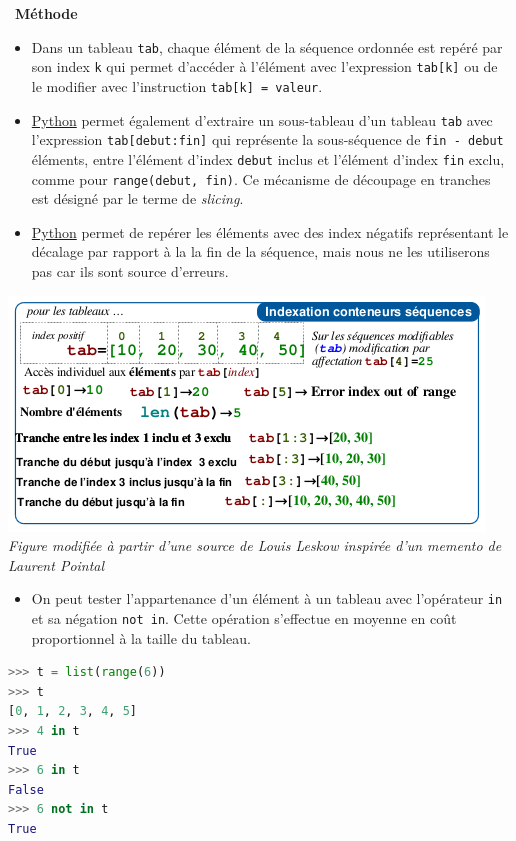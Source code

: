 \documentclass[
  11pt,
]{article}
\newcommand{\passthrough}[1]{#1}
\providecommand{\tightlist}{%
  \setlength{\itemsep}{0pt}\setlength{\parskip}{0pt}}
\newcounter{prop}
\newenvironment{methode}[1]
{\par \medskip    \noindent  
 \begin {bclogo}[arrondi =0.1,logo=\bcoutil, marge=4,noborder = true] {~\textbf{Méthode}   {\itshape #1} }  \par}
{
\end{bclogo}
 \par \bigskip }
\begin{document}
\begin{methode}{}

\begin{itemize}
\tightlist
\item
  Dans un tableau \passthrough{\lstinline!tab!}, chaque élément de la
  séquence ordonnée est repéré par son index \passthrough{\lstinline!k!}
  qui permet d'accéder à l'élément avec l'expression
  \passthrough{\lstinline!tab[k]!} ou de le modifier avec l'instruction
  \passthrough{\lstinline!tab[k] = valeur!}.
\item
  \href{https://docs.python.org/3/tutorial/datastructures.html}{Python}
  permet également d'extraire un sous-tableau d'un tableau
  \passthrough{\lstinline!tab!} avec l'expression
  \passthrough{\lstinline!tab[debut:fin]!} qui représente la
  sous-séquence de \passthrough{\lstinline!fin - debut!} éléments, entre
  l'élément d'index \passthrough{\lstinline!debut!} inclus et l'élément
  d'index \passthrough{\lstinline!fin!} exclu, comme pour
  \passthrough{\lstinline!range(debut, fin)!}. Ce mécanisme de découpage
  en tranches est désigné par le terme de \emph{slicing}.
\item
  \href{https://docs.python.org/3/tutorial/datastructures.html}{Python}
  permet de repérer les éléments avec des index négatifs représentant le
  décalage par rapport à la la fin de la séquence, mais nous ne les
  utiliserons pas car ils sont source d'erreurs.
\end{itemize}

\includegraphics{images/slices.png}\\

\emph{Figure modifiée à partir d'une source de Louis Leskow inspirée
d'un memento de Laurent Pointal}

\begin{itemize}
\tightlist
\item
  On peut tester l'appartenance d'un élément à un tableau avec
  l'opérateur \passthrough{\lstinline!in!} et sa négation
  \passthrough{\lstinline!not in!}. Cette opération s'effectue en
  moyenne en coût proportionnel à la taille du tableau.
\end{itemize}

\begin{lstlisting}[language=Python]
>>> t = list(range(6))
>>> t
[0, 1, 2, 3, 4, 5]
>>> 4 in t
True
>>> 6 in t
False
>>> 6 not in t
True
\end{lstlisting}

\end{methode}
\end{document}
